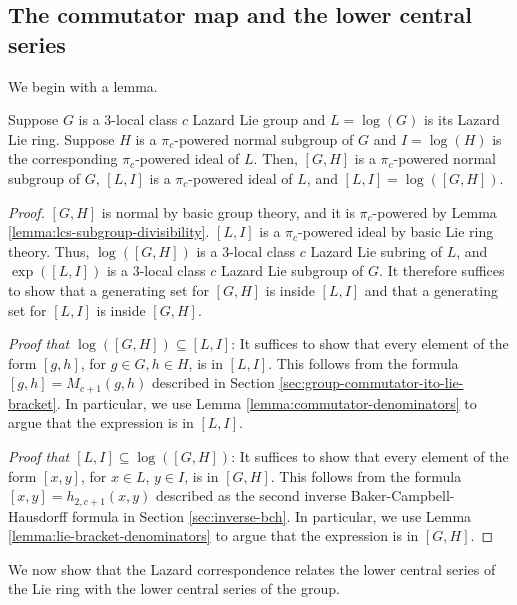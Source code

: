 \subsection{The commutator map and the lower central series}

We begin with a lemma.

\begin{lemma}\label{lemma:derived-subgroup-same-group-lie-ring}
  Suppose $G$ is a $3$-local class $c$ Lazard Lie group and $L =
  \log(G)$ is its Lazard Lie ring. Suppose $H$ is a $\pi_c$-powered
  normal subgroup of $G$ and $I = \log(H)$ is the corresponding
  $\pi_c$-powered ideal of $L$. Then, $[G,H]$ is a $\pi_c$-powered
  normal subgroup of $G$, $[L,I]$ is a $\pi_c$-powered ideal of $L$,
  and $[L,I] = \log([G,H])$.
\end{lemma}

\begin{proof}
  $[G,H]$ is normal by basic group theory, and it is $\pi_c$-powered
  by Lemma \ref{lemma:lcs-subgroup-divisibility}. $[L,I]$ is a
  $\pi_c$-powered ideal by basic Lie ring theory. Thus, $\log([G,H])$
  is a $3$-local class $c$ Lazard Lie subring of $L$, and
  $\exp([L,I])$ is a $3$-local class $c$ Lazard Lie subgroup of
  $G$. It therefore suffices to show that a generating set for $[G,H]$
  is inside $[L,I]$ and that a generating set for $[L,I]$ is inside
  $[G,H]$.

  {\em Proof that $\log([G,H]) \subseteq [L,I]$}: It suffices to show
  that every element of the form $[g,h]$, for $g \in G, h \in H$, is in
  $[L,I]$. This follows from the formula $[g,h] = M_{c+1}(g,h)$
  described in Section \ref{sec:group-commutator-ito-lie-bracket}. In
  particular, we use Lemma \ref{lemma:commutator-denominators} to
  argue that the expression is in $[L,I]$.

  {\em Proof that $[L,I] \subseteq \log([G,H])$}: It suffices to show
  that every element of the form $[x,y]$, for $x \in L$, $y \in I$, is
  in $[G,H]$. This follows from the formula $[x,y] = h_{2,c+1}(x,y)$
  described as the second inverse Baker-Campbell-Hausdorff formula in
  Section \ref{sec:inverse-bch}. In particular, we use Lemma
  \ref{lemma:lie-bracket-denominators} to argue that the expression is
  in $[G,H]$.
\end{proof}

We now show that the Lazard correspondence relates the lower central
series of the Lie ring with the lower central series of the group.

